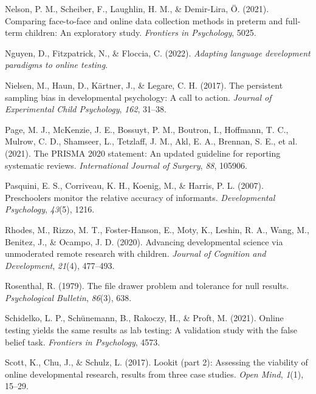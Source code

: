 \documentclass[
  man,floatsintext]{apa6}
\newlength{\cslhangindent}
\newlength{\cslentryspacingunit} %
\newenvironment{CSLReferences}[2] %
 {%
  \setlength{\parindent}{0pt}
  \ifodd #1
  \let\oldpar\par
  \def\par{\hangindent=\cslhangindent\oldpar}
  \fi
  \setlength{\parskip}{#2\cslentryspacingunit}
 }%
 {}
\begin{document}
\begin{CSLReferences}{1}{0}
\leavevmode{}%
Nelson, P. M., Scheiber, F., Laughlin, H. M., \& Demir-Lira, Ö. (2021). Comparing face-to-face and online data collection methods in preterm and full-term children: An exploratory study. \emph{Frontiers in Psychology}, 5025.

\leavevmode{}%
Nguyen, D., Fitzpatrick, N., \& Floccia, C. (2022). \emph{Adapting language development paradigms to online testing}.

\leavevmode{}%
Nielsen, M., Haun, D., Kärtner, J., \& Legare, C. H. (2017). The persistent sampling bias in developmental psychology: A call to action. \emph{Journal of Experimental Child Psychology}, \emph{162}, 31--38.

\leavevmode{}%
Page, M. J., McKenzie, J. E., Bossuyt, P. M., Boutron, I., Hoffmann, T. C., Mulrow, C. D., Shamseer, L., Tetzlaff, J. M., Akl, E. A., Brennan, S. E., et al. (2021). The PRISMA 2020 statement: An updated guideline for reporting systematic reviews. \emph{International Journal of Surgery}, \emph{88}, 105906.

\leavevmode{}%
Pasquini, E. S., Corriveau, K. H., Koenig, M., \& Harris, P. L. (2007). Preschoolers monitor the relative accuracy of informants. \emph{Developmental Psychology}, \emph{43}(5), 1216.

\leavevmode{}%
Rhodes, M., Rizzo, M. T., Foster-Hanson, E., Moty, K., Leshin, R. A., Wang, M., Benitez, J., \& Ocampo, J. D. (2020). Advancing developmental science via unmoderated remote research with children. \emph{Journal of Cognition and Development}, \emph{21}(4), 477--493.

\leavevmode{}%
Rosenthal, R. (1979). The file drawer problem and tolerance for null results. \emph{Psychological Bulletin}, \emph{86}(3), 638.

\leavevmode{}%
Schidelko, L. P., Schünemann, B., Rakoczy, H., \& Proft, M. (2021). Online testing yields the same results as lab testing: A validation study with the false belief task. \emph{Frontiers in Psychology}, 4573.

\leavevmode{}%
Scott, K., Chu, J., \& Schulz, L. (2017). Lookit (part 2): Assessing the viability of online developmental research, results from three case studies. \emph{Open Mind}, \emph{1}(1), 15--29.


\end{CSLReferences}
\end{document}
